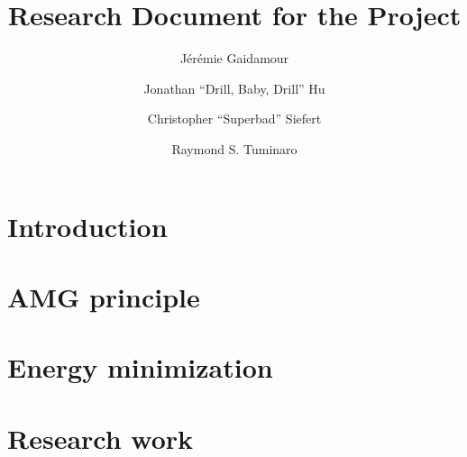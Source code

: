 \documentclass[pdf,ps2pdf,12pt,report]{article}
\title{Research Document for the \mloo Project}
\author[1]{J\'er\'emie Gaidamour}
\author[1]{Jonathan ``Drill, Baby, Drill'' Hu}
\author[2]{Christopher ``Superbad'' Siefert}
\author[1]{Raymond S. Tuminaro}
\affil[1]{Scalable Algorithms Department}
\affil[2]{Computational Shock \& Multiphysics Department}
\begin{document}
  \maketitle

  \tableofcontents

  \section{Introduction}
  

  \section{AMG principle}\label{amg}
  

  \section{Energy minimization}\label{emin}
  
  
  \section{Research work}\label{work}
  
\end{document}
